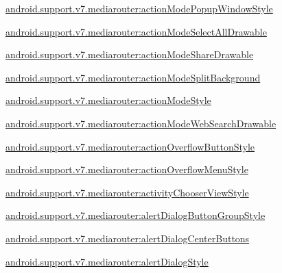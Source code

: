 {\ttfamily \hyperlink{classandroid_1_1support_1_1v7_1_1mediarouter_1_1R_1_1styleable_a5f3bae33936a9476e7e6a9dab290157f}{android.\+support.\+v7.\+mediarouter\+:action\+Mode\+Popup\+Window\+Style}}

{\ttfamily \hyperlink{classandroid_1_1support_1_1v7_1_1mediarouter_1_1R_1_1styleable_a8e509977527febb24aa3df6255a62133}{android.\+support.\+v7.\+mediarouter\+:action\+Mode\+Select\+All\+Drawable}}

{\ttfamily \hyperlink{classandroid_1_1support_1_1v7_1_1mediarouter_1_1R_1_1styleable_a305e4c84830a00514e165895e02e495b}{android.\+support.\+v7.\+mediarouter\+:action\+Mode\+Share\+Drawable}}

{\ttfamily \hyperlink{classandroid_1_1support_1_1v7_1_1mediarouter_1_1R_1_1styleable_abc934a2d6ba38ecd031b953990596657}{android.\+support.\+v7.\+mediarouter\+:action\+Mode\+Split\+Background}}

{\ttfamily \hyperlink{classandroid_1_1support_1_1v7_1_1mediarouter_1_1R_1_1styleable_aa2e34e25fe2d921d8ba076badd8da157}{android.\+support.\+v7.\+mediarouter\+:action\+Mode\+Style}}

{\ttfamily \hyperlink{classandroid_1_1support_1_1v7_1_1mediarouter_1_1R_1_1styleable_a8750fdc15dc71047eb1dcd4f7bb5479e}{android.\+support.\+v7.\+mediarouter\+:action\+Mode\+Web\+Search\+Drawable}}

{\ttfamily \hyperlink{classandroid_1_1support_1_1v7_1_1mediarouter_1_1R_1_1styleable_ac665d51a11a8dd32d6ce85955504ca2a}{android.\+support.\+v7.\+mediarouter\+:action\+Overflow\+Button\+Style}}

{\ttfamily \hyperlink{classandroid_1_1support_1_1v7_1_1mediarouter_1_1R_1_1styleable_a64e7ff0b0b48c4a78c68ba5fec7fe779}{android.\+support.\+v7.\+mediarouter\+:action\+Overflow\+Menu\+Style}}

{\ttfamily \hyperlink{classandroid_1_1support_1_1v7_1_1mediarouter_1_1R_1_1styleable_ac7174a04e7b274cbb6fb345ebb1c514b}{android.\+support.\+v7.\+mediarouter\+:activity\+Chooser\+View\+Style}}

{\ttfamily \hyperlink{classandroid_1_1support_1_1v7_1_1mediarouter_1_1R_1_1styleable_a3a3facde74bdd9f3ab7535e69a8b2bab}{android.\+support.\+v7.\+mediarouter\+:alert\+Dialog\+Button\+Group\+Style}}

{\ttfamily \hyperlink{classandroid_1_1support_1_1v7_1_1mediarouter_1_1R_1_1styleable_abcca492d47ce112a675f207ef0498cf8}{android.\+support.\+v7.\+mediarouter\+:alert\+Dialog\+Center\+Buttons}}

{\ttfamily \hyperlink{classandroid_1_1support_1_1v7_1_1mediarouter_1_1R_1_1styleable_aa0353bad7ae900c7e85a37565a5fb265}{android.\+support.\+v7.\+mediarouter\+:alert\+Dialog\+Style}}


